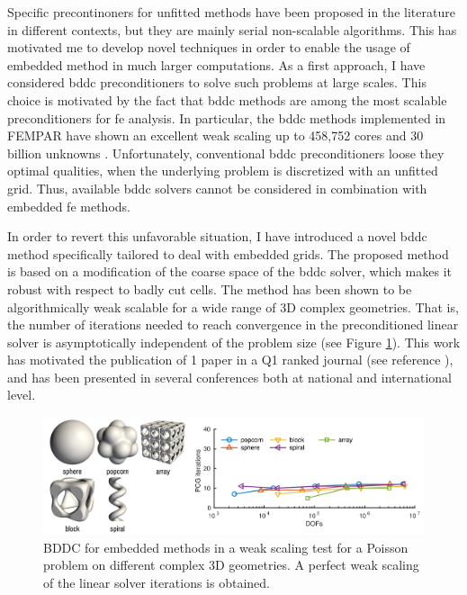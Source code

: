 \documentclass{article}
\begin{document}
Specific precontinoners for unfitted methods have been proposed in the literature in different contexts, but they are mainly serial non-scalable algorithms.  This has motivated me to develop novel techniques in order to enable the usage of embedded method in much larger computations. As a first approach, I have considered \ac{bddc} preconditioners to solve such problems at large scales. This choice is motivated by the fact that \ac{bddc} methods are among the most scalable preconditioners for \ac{fe} analysis. In particular, the \ac{bddc} methods implemented in FEMPAR  have shown an excellent weak scaling up to 458,752 cores and 30 billion unknowns \cite{badia_2016}. Unfortunately, conventional \ac{bddc} preconditioners loose they optimal qualities, when the underlying problem is discretized with an unfitted grid. Thus, available \ac{bddc} solvers cannot be considered in combination with embedded \ac{fe} methods. 

In order to revert this unfavorable situation, {{I have introduced a novel \ac{bddc} method  specifically tailored to deal with embedded grids}}. The proposed method is based on a modification of the coarse space of the \ac{bddc} solver,  which makes it robust with respect to badly cut cells. The method has been shown to be algorithmically weak scalable for a wide range of 3D complex geometries. That is, the number of iterations needed to reach convergence in the preconditioned linear solver is asymptotically independent of the problem size (see Figure \ref{fig:fitted-vs-unfitted-bddc}). This work has motivated the {{publication of 1 paper in a Q1 ranked journal}} (see reference \cite{badia_2017}), and has been presented in several conferences both at national and international level.

\begin{figure}[ht!]
\includegraphics[width=\textwidth]{../_assets/fig2.png}
\caption{BDDC for embedded methods in a weak scaling test for a Poisson problem on different complex  3D geometries. A perfect weak scaling of the linear solver iterations is obtained.}
\label{fig:fitted-vs-unfitted-bddc}
\end{figure}
\end{document}
